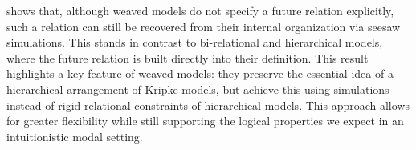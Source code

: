  shows that, although weaved models do not specify a future relation explicitly, such a relation can still be recovered from their internal organization via seesaw simulations. This stands in contrast to bi-relational and hierarchical models, where the future relation is built directly into their definition. This result highlights a key feature of weaved models: they preserve the essential idea of a hierarchical arrangement of Kripke models, but achieve this using simulations instead of rigid relational constraints of hierarchical models. This approach allows for greater flexibility while still supporting the logical properties we expect in an intuitionistic modal setting.


